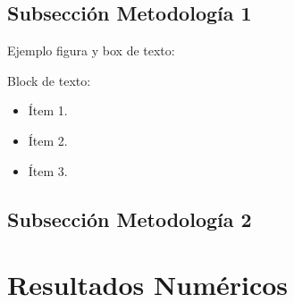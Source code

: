 \documentclass[
  aspectratio=169,
]{beamer}
\begin{document}
\begin{small}
\subsection[Subsección Metodología 1 ]{Subsección Metodología 1}

\begin{frame}{Ejemplo figura y box de texto:}
		\begin{minipage}[t]{0.35\linewidth}
		\begin{figure}[htbp]
			\centering
			\def\svgwidth{50mm}
			
		\end{figure}
		\end{minipage}\hfill
		\begin{minipage}[t]{0.64\linewidth}
			\begin{block}{Block de texto:}
				\begin{itemize}
				\item Ítem 1.
				\pause
				\item Ítem 2.
				\pause
				\item Ítem 3.
				\end{itemize}
			\end{block}
		\end{minipage}
\end{frame}

\subsection[Subsección Metodología 2 ]{Subsección Metodología 2}

 \section[Resultados Numéricos]{Resultados Numéricos}

\end{small}
\end{document}

